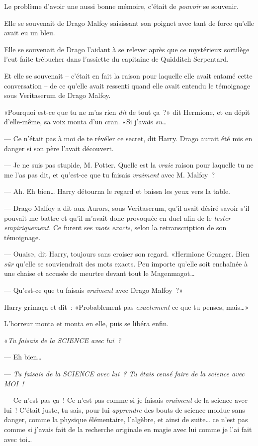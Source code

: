 Le problème d'avoir une aussi bonne mémoire, c'était de \emph{pouvoir} se souvenir.

Elle se souvenait de Drago Malfoy saisissant son poignet avec tant de force qu'elle avait eu un bleu.

Elle se souvenait de Drago l'aidant à se relever après que ce mystérieux sortilège l'eut faite trébucher dans l'assiette du capitaine de Quidditch Serpentard.

Et elle se souvenait -- c'était en fait la raison pour laquelle elle avait entamé cette conversation -- de ce qu'elle avait ressenti quand elle avait entendu le témoignage sous Veritaserum de Drago Malfoy.

«Pourquoi est-ce que tu ne m'as rien \emph{dit} de tout ça~?» dit Hermione, et en dépit d'elle-même, sa voix monta d'un cran. «Si j'avais \emph{su}…

--- Ce n'était pas à moi de te révéler ce secret, dit Harry. Drago aurait été mis en danger si son père l'avait découvert.

--- Je ne suis pas stupide, M. Potter. Quelle est la \emph{vraie} raison pour laquelle tu ne me l'as pas dit, et qu'est-ce que tu faisais \emph{vraiment} avec M. Malfoy~?

--- Ah. Eh bien… Harry détourna le regard et baissa les yeux vers la table.

--- Drago Malfoy a dit aux Aurors, sous Veritaserum, qu'il avait désiré savoir s'il pouvait me battre et qu'il m'avait donc provoquée en duel afin de le \emph{tester empiriquement}. Ce furent ses \emph{mots exacts}, selon la retranscription de son témoignage.

--- Ouais», dit Harry, toujours sans croiser son regard. «Hermione Granger. Bien \emph{sûr} qu'elle se souviendrait des mots exacts. Peu importe qu'elle soit enchaînée à une chaise et accusée de meurtre devant tout le Magenmagot…

--- Qu'est-ce que tu faisais \emph{vraiment} avec Drago Malfoy~?»

Harry grimaça et dit~: «Probablement pas \emph{exactement} ce que tu penses, mais…»

L'horreur monta et monta en elle, puis se libéra enfin.

«\emph{Tu faisais de la SCIENCE avec lui~?}

--- Eh bien…

--- \emph{Tu faisais de la SCIENCE avec lui~? Tu étais censé faire de la science avec MOI~!}

--- Ce n'est pas ça~! Ce n'est pas comme si je faisais \emph{vraiment} de la science avec lui~! C'était juste, tu sais, pour lui \emph{apprendre} des bouts de science moldue sans danger, comme la physique élémentaire, l'algèbre, et ainsi de suite… ce n'est pas comme si j'avais fait de la recherche originale en magie avec lui comme je l'ai fait avec toi…

